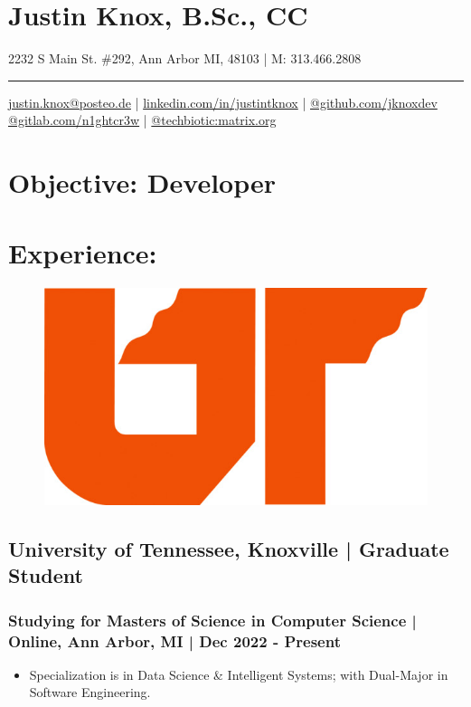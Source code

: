 \documentclass[letter,10pt]{article}
\author{jknox}
\date{\today}
\title{}
\begin{document}
\section*{Justin Knox, B.Sc., CC}
\label{sec:org9636de1}
2232 S Main St. \#292, Ann Arbor MI, 48103 | M: 313.466.2808

\noindent\rule{\textwidth}{0.5pt}
\href{mailto:justin.knox@posteo.de}{justin.knox@posteo.de} | \href{https://www.linkedin.com/in/justintknox}{linkedin.com/in/justintknox} | \href{https://www.github.com/jknoxdev}{@github.com/jknoxdev} \\
\href{https://gitlab.com/n1ghtcr3w}{@gitlab.com/n1ghtcr3w} | \href{https://matrix.to/\#/@techbiotic:matrix.org}{@techbiotic:matrix.org}


\section*{Objective:              Developer}
\label{sec:orgb4ea75e}
\section*{Experience:}
\label{sec:org6f4d4fb}
\begin{figure}
\includegraphics[width=0.45\linewidth]{./img/50p_cr_utk.jpg}
\end{figure}

\subsection*{University of Tennessee, Knoxville | Graduate Student}
\label{sec:orgd786207}
\subsubsection*{Studying for Masters of Science in Computer Science | Online, Ann Arbor, MI | Dec 2022 - Present}
\label{sec:org808471b}
\begin{itemize}
\item Specialization is in Data Science \& Intelligent Systems; with Dual-Major in Software Engineering.
\end{itemize}
\end{document}
